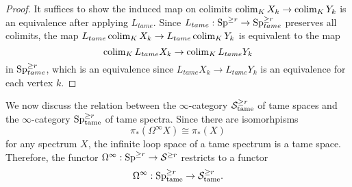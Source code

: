 \begin{proof}
	It suffices to show the induced map on colimits
	$\operatorname{colim}_{K}X_k \to \operatorname{colim}_{K}Y_k$ is an equivalence after applying $L_{tame}$.
	Since $L_{tame}:\operatorname{Sp}^{\geq r}\to \operatorname{Sp}_{tame}^{\geq r}$ preserves all colimits,
	the map $L_{tame}\operatorname{colim}_{K}X_k \to L_{tame}\operatorname{colim}_{K}Y_k$ is equivalent to the map 
	$$
	\operatorname{colim}_{K}L_{tame}X_k \to \operatorname{colim}_{K}L_{tame}Y_k
	$$
	in $\operatorname{Sp}_{tame}^{\geq r}$, which is an equivalence since $L_{tame}X_k \to L_{tame}Y_k$ is an equivalence for each vertex $k$.
	
	
\end{proof}


We now discuss the relation between the $\infty$-category ${\mathcal{S}}^{\geq r}_{\operatorname{\operatorname{tame}}}$ of tame spaces and the $\infty$-category $\operatorname{Sp}^{\geq r}_{\operatorname{\operatorname{tame}}}$ of tame spectra.
Since there are isomorhpisms
$$
\pi_*(\Omega^{\infty}X) \cong \pi_* (X)
$$
for any spectrum $X$,
		the infinite loop space of a tame spectrum is a tame space. 
Therefore, the functor $\Omega^{\infty}:\operatorname{Sp}^{\geq r}\to 
{\mathcal{S}}^{\geq r}$ restricts to a functor
$$
\Omega^{\infty}: \operatorname{Sp}^{\geq r}_{\operatorname{\operatorname{tame}}} 
\to 
{\mathcal{S}}^{\geq r}_{\operatorname{\operatorname{tame}}}.
$$



